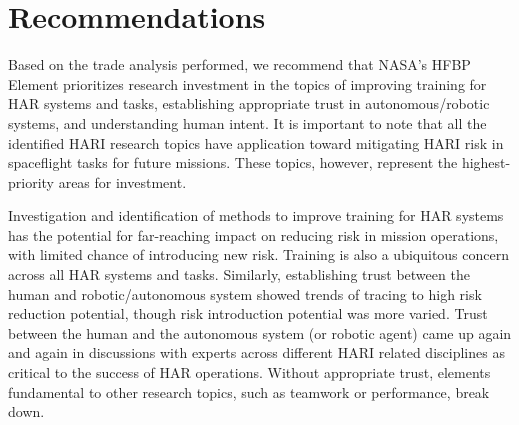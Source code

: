 

\section{Recommendations}
Based on the trade analysis performed, we recommend that NASA's HFBP Element prioritizes research investment in the topics of improving training for HAR systems and tasks, establishing appropriate trust in autonomous/robotic systems, and understanding human intent.
It is important to note that all the identified HARI research topics have application toward mitigating HARI risk in spaceflight tasks for future missions.
These topics, however, represent the highest-priority areas for investment.

Investigation and identification of methods to improve training for HAR systems has the potential for far-reaching impact on reducing risk in mission operations, with limited chance of introducing new risk.
Training is also a ubiquitous concern across all HAR systems and tasks.
Similarly, establishing trust between the human and robotic/autonomous system showed trends of tracing to high risk reduction potential, though risk introduction potential was more varied.
Trust between the human and the autonomous system (or robotic agent) came up again and again in discussions with experts across different HARI related disciplines as critical to the success of HAR operations.
Without appropriate trust, elements fundamental to other research topics, such as teamwork or performance, break down.


